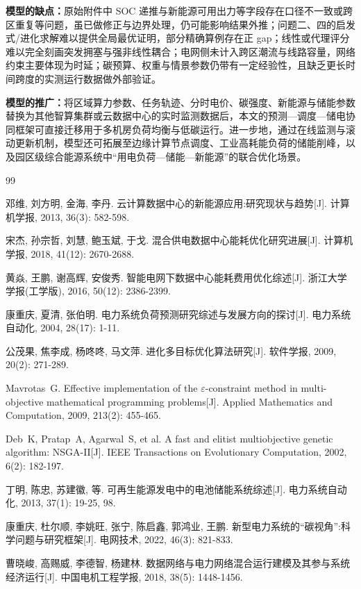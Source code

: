 \documentclass[UTF8,a4paper,zihao=-4]{ctexart}
\begin{document}
\textbf{模型的缺点：}原始附件中 SOC 递推与新能源可用出力等字段存在口径不一致或跨区重复等问题，虽已做修正与边界处理，仍可能影响结果外推；问题二、四的启发式/进化求解难以提供全局最优证明，部分精确算例存在正 gap；线性或代理评分难以完全刻画突发拥塞与强非线性耦合；电网侧未计入跨区潮流与线路容量，网络约束主要体现为时延；碳预算、权重与情景参数仍带有一定经验性，且缺乏更长时间跨度的实测运行数据做外部验证。

\textbf{模型的推广：}将区域算力参数、任务轨迹、分时电价、碳强度、新能源与储能参数替换为其他智算集群或云数据中心的实时监测数据后，本文的预测—调度—储电协同框架可直接迁移用于多机房负荷均衡与低碳运行。进一步地，通过在线监测与滚动更新机制，模型还可拓展至边缘计算节点调度、工业高耗能负荷的储能削峰，以及园区级综合能源系统中“用电负荷—储能—新能源”的联合优化场景。
\newpage
{}


\vspace{1em}


\begin{thebibliography}{99}

邓维, 刘方明, 金海, 李丹. 云计算数据中心的新能源应用:研究现状与趋势[J]. 计算机学报, 2013, 36(3): 582-598.

宋杰, 孙宗哲, 刘慧, 鲍玉斌, 于戈. 混合供电数据中心能耗优化研究进展[J]. 计算机学报, 2018, 41(12): 2670-2688.

黄焱, 王鹏, 谢高辉, 安俊秀. 智能电网下数据中心能耗费用优化综述[J]. 浙江大学学报(工学版), 2016, 50(12): 2386-2399.

康重庆, 夏清, 张伯明. 电力系统负荷预测研究综述与发展方向的探讨[J]. 电力系统自动化, 2004, 28(17): 1-11.

公茂果, 焦李成, 杨咚咚, 马文萍. 进化多目标优化算法研究[J]. 软件学报, 2009, 20(2): 271-289.

Mavrotas~G. Effective implementation of the $\varepsilon$-constraint method in multi-objective mathematical programming problems[J]. Applied Mathematics and Computation, 2009, 213(2): 455-465.

Deb~K, Pratap~A, Agarwal~S, et al. A fast and elitist multiobjective genetic algorithm: NSGA-II[J]. IEEE Transactions on Evolutionary Computation, 2002, 6(2): 182-197.

丁明, 陈忠, 苏建徽, 等. 可再生能源发电中的电池储能系统综述[J]. 电力系统自动化, 2013, 37(1): 19-25, 98.

康重庆, 杜尔顺, 李姚旺, 张宁, 陈启鑫, 郭鸿业, 王鹏. 新型电力系统的“碳视角”:科学问题与研究框架[J]. 电网技术, 2022, 46(3): 821-833.

曹晓峻, 高赐威, 李德智, 杨建林. 数据网络与电力网络混合运行建模及其参与系统经济运行[J]. 中国电机工程学报, 2018, 38(5): 1448-1456.

\end{thebibliography}
\end{document}
